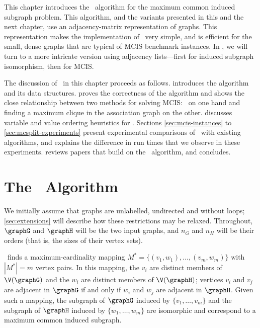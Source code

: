 This chapter introduces the \McSplit\ algorithm for the
maximum common induced subgraph problem.  This algorithm, and the
variants presented in this and the next chapter, use an adjacency-matrix
representation of graphs. This representation makes the implementation of
\McSplit\ very simple, and is efficient for the small, dense graphs that are
typical of MCIS benchmark instances.  
In , we will turn to a more intricate version using
adjacency lists---first for induced subgraph isomorphism, then for
MCIS.

The discussion of \McSplit\ in this chapter proceeds as follows.
 introduces the algorithm and its data structures.
 proves the correctness of the algorithm
and shows the close relationship between two methods for solving
MCIS: \McSplit\ on one hand and
finding a maximum clique in the association graph on the other.
 discusses variable and value ordering
heuristics for \McSplit.
Sections \ref{sec:mcis-instances} 
to \ref{sec:mcsplit-experiments}
present experimental comparisons of
\McSplit\ with existing algorithms, and
 explains the difference in run times that
we observe in these experiments.
 reviews papers that build on the \McSplit\
algorithm, and  concludes.

\section{The \McSplit\ Algorithm \label{sec:mcsplit}}

We initially assume that graphs are unlabelled, undirected and without loops;
\cref{sec:extensions} will describe how these restrictions may be relaxed.
Throughout, $\graphG$ and $\graphH$ will be the two input graphs, and
$n_G$ and $n_H$ will be their orders (that is, the sizes of their vertex sets).

\McSplit\
finds a maximum-cardinality mapping $M^* = \{(v_1, w_1), \dots, (v_{m},
w_{m})\}$ with $|M^*| = m$ vertex pairs.
In this mapping, the $v_i$ are distinct members of
$\V(\graphG)$ and the $w_i$ are distinct members of $\V(\graphH)$;
vertices $v_i$ and $v_j$ are adjacent in $\graphG$ if and only if $w_i$ and $w_j$
are adjacent in $\graphH$.  Given such a mapping, the subgraph of $\graphG$
induced by $\{v_1, \dots, v_{m}\}$ and the subgraph of $\graphH$ induced by
$\{w_1, \dots, w_{m}\}$ are isomorphic and correspond to a maximum common
induced subgraph.

